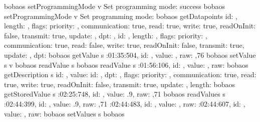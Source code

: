 \documentclass[letterpaper,10pt,english]{sphinxmanual}
\begin{document}
%
\begin{sphinxVerbatim}[commandchars=\\\{\}]
bobaos\PYGZgt{} setProgrammingMode \PYGZhy{}v 
Set programming mode: success
bobaos\PYGZgt{} setProgrammingMode \PYGZhy{}v 
Set programming mode: 
bobaos\PYGZgt{} getDatapoints
\PYG{o}{[}  id: ,
    length: ,
    flags:
     priority: ,
      communication: true,
      read: true,
      write: true,
      readOnInit: false,
      transmit: true,
      update:  ,
      dpt:  ,
   id: ,
    length: ,
    flags:
     priority: ,
      communication: true,
      read: false,
      write: true,
      readOnInit: false,
      transmit: true,
      update:  ,
      dpt:   \PYG{o}{]}
bobaos\PYGZgt{} getValue \PYGZhy{}s 
:01:35:504,    id: , value: , raw: \PYG{o}{[},76\PYG{o}{]}
bobaos\PYGZgt{} setValue \PYGZhy{}s  \PYGZhy{}v 
bobaos\PYGZgt{} readValue \PYGZhy{}s 
bobaos\PYGZgt{} readValue \PYGZhy{}s 
:01:56:106,    id: , value: , raw: \PYG{o}{[}\PYG{o}{]}
bobaos\PYGZgt{} getDescription \PYGZhy{}s 
 id: ,
  value:
   id: ,
    dpt: ,
    flags:
     priority: ,
      communication: true,
      read: true,
      write: true,
      readOnInit: false,
      transmit: true,
      update:  ,
      length:   
bobaos\PYGZgt{} getStoredValue \PYGZhy{}s 
:02:25:748,    id: , value: .9, raw: \PYG{o}{[},71\PYG{o}{]}
bobaos\PYGZgt{} readValues \PYGZhy{}s 
:02:44:399,    id: , value: .9, raw: \PYG{o}{[},71\PYG{o}{]}
:02:44:483,    id: , value: , raw: \PYG{o}{[}\PYG{o}{]}
:02:44:607,    id: , value: , raw: \PYG{o}{[}\PYG{o}{]}
bobaos\PYGZgt{} setValues \PYGZhy{}s 
bobaos\PYGZgt{}
\end{sphinxVerbatim}
\end{document}
